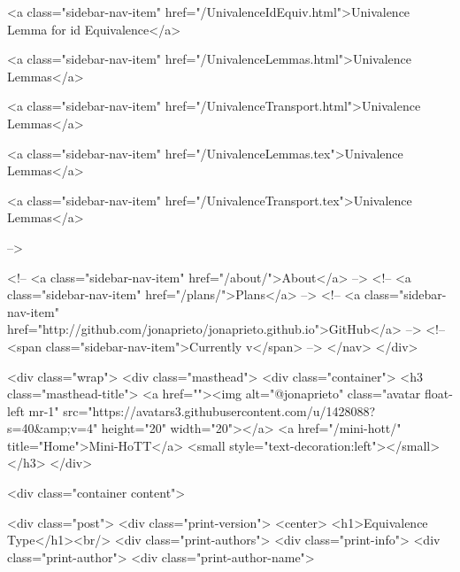       
    
      
        
          <a class="sidebar-nav-item" href="/UnivalenceIdEquiv.html">Univalence Lemma for id Equivalence</a>
        
      
    
      
        
          <a class="sidebar-nav-item" href="/UnivalenceLemmas.html">Univalence Lemmas</a>
        
      
    
      
        
          <a class="sidebar-nav-item" href="/UnivalenceTransport.html">Univalence Lemmas</a>
        
      
    
      
        
          <a class="sidebar-nav-item" href="/UnivalenceLemmas.tex">Univalence Lemmas</a>
        
      
    
      
        
          <a class="sidebar-nav-item" href="/UnivalenceTransport.tex">Univalence Lemmas</a>
        
      
     -->

    <!-- <a class="sidebar-nav-item" href="/about/">About</a> -->
    <!-- <a class="sidebar-nav-item" href="/plans/">Plans</a> -->
    <!-- <a class="sidebar-nav-item" href="http://github.com/jonaprieto/jonaprieto.github.io">GitHub</a> -->
    <!-- <span class="sidebar-nav-item">Currently v</span> -->
  </nav>
</div>

    <div class="wrap">
      <div class="masthead">
        <div class="container">
          <h3 class="masthead-title">
            <a href=""><img alt="@jonaprieto" class="avatar float-left mr-1" src="https://avatars3.githubusercontent.com/u/1428088?s=40&amp;v=4" height="20" width="20"></a>
            <a href="/mini-hott/" title="Home">Mini-HoTT</a>
            <small style="text-decoration:left"></small>
          </h3>
        </div>
      
      <div class="container content">
        







<div class="post">
  <div class="print-version">
    <center>
      <h1>Equivalence Type</h1><br/>
        <div class="print-authors">
          <div class="print-info">
            <div class="print-author">
              <div class="print-author-name">
                
